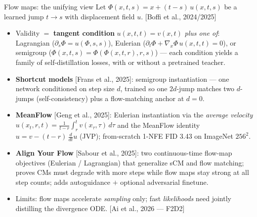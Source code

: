 \documentclass[aspectratio=169,10pt]{beamer}
\newcommand{\litref}[1]{{\scriptsize\color{black!55}[#1]}}
\begin{document}
\begin{frame}{Flow maps: the unifying view}
  Let $\Phi(x, t, s) = x + (t - s)\, u(x, t, s)$ be a learned jump $t \to s$
  with displacement field $u$. \litref{Boffi et al., 2024/2025}
  \begin{itemize}
    \item Validity $=$ \textbf{tangent condition} $u(x,t,t) = v(x,t)$
      \emph{plus one of}: Lagrangian
      ($\partial_s \Phi = u(\Phi, s, s)$), Eulerian
      ($\partial_t \Phi + \nabla_x \Phi\, u(x,t,t) = 0$), or semigroup
      ($\Phi(x,t,s) = \Phi(\Phi(x,t,r), r, s)$) --- each condition yields a
      family of self-distillation losses, with or without a pretrained
      teacher.
    \item \textbf{Shortcut models} \litref{Frans et al., 2025}: semigroup
      instantiation --- one network conditioned on step size $d$, trained so
      one $2d$-jump matches two $d$-jumps (self-consistency) plus a flow-matching
      anchor at $d{=}0$.
    \item \textbf{MeanFlow} \litref{Geng et al., 2025}: Eulerian instantiation
      via the \emph{average velocity}
      $u(x_t, r, t) = \frac{1}{t-r}\int_r^t v(x_\tau, \tau)\, d\tau$ and the
      MeanFlow identity $u = v - (t{-}r)\, \frac{d}{dt}u$ (JVP); from-scratch
      1-NFE FID 3.43 on ImageNet $256^2$.
    \item \textbf{Align Your Flow} \litref{Sabour et al., 2025}: two
      continuous-time flow-map objectives (Eulerian / Lagrangian) that
      generalize sCM and flow matching; proves CMs must degrade with more
      steps while flow maps stay strong at all step counts; adds autoguidance
      $+$ optional adversarial finetune.
    \item Limits: flow maps accelerate \emph{sampling} only; fast
      \emph{likelihoods} need jointly distilling the divergence ODE.
      \litref{Ai et al., 2026 --- F2D2}
  \end{itemize}
\end{frame}
\end{document}
